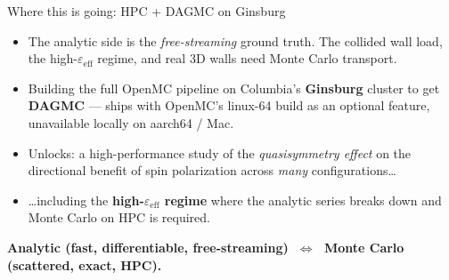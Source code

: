 \documentclass[aspectratio=169]{beamer}
\newcommand{\eps}{\varepsilon}
\begin{document}
\begin{frame}{Where this is going: HPC + DAGMC on Ginsburg}
  \small
  \begin{itemize}
    \item The analytic side is the \emph{free-streaming} ground truth. The collided wall load,
          the high-$\eps_{\mathrm{eff}}$ regime, and real 3D walls need Monte Carlo transport.
    \item Building the full OpenMC pipeline on Columbia's \textbf{Ginsburg} cluster to get
          \textbf{DAGMC} --- ships with OpenMC's linux-64 build as an optional feature,
          unavailable locally on aarch64 / Mac.
    \item Unlocks: a high-performance study of the \emph{quasisymmetry effect} on the directional
          benefit of spin polarization across \emph{many} configurations\ldots
    \item \ldots including the \textbf{high-$\eps_{\mathrm{eff}}$ regime} where the analytic series
          breaks down and Monte Carlo on HPC is required.
  \end{itemize}
  \vspace{0.5em}
  \centering\textbf{Analytic (fast, differentiable, free-streaming) $\;\Longleftrightarrow\;$
  Monte Carlo (scattered, exact, HPC).}
\end{frame}
\end{document}
